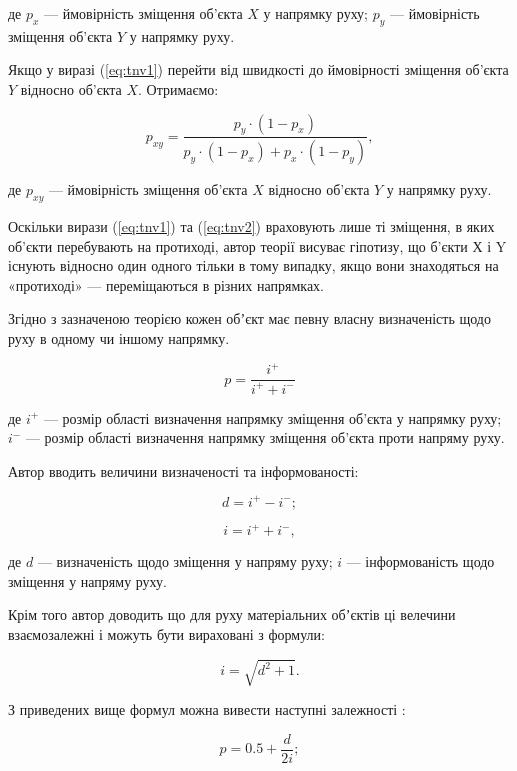 \noindent
де $p_x$ --- ймовірність зміщення об'єкта $X$ у напрямку руху; $p_y$ --- ймовірність зміщення об'єкта $Y$ у напрямку руху.

Якщо у виразі (\ref{eq:tnv1}) перейти від швидкості до ймовірності зміщення об'єкта $Y$ відносно об'єкта $X$. Отримаємо:

\begin{equation}
\label{eq:tnv2}
p_{xy}=\frac{p_y\cdot(1-p_x)}{p_y\cdot(1-p_x)+p_x\cdot(1-p_y)},
\end{equation}

\noindent
де $p_{xy}$ --- ймовірність зміщення об'єкта $X$ відносно об'єкта $Y$ у напрямку руху.

Оскільки вирази (\ref{eq:tnv1}) та (\ref{eq:tnv2}) враховують лише ті зміщення, в яких об'єкти перебувають на протиході, автор теорії висуває гіпотизу, що б'єкти Х і Y існують відносно один одного тільки в тому випадку, якщо вони знаходяться на «протиході» --- переміщаються в різних напрямках.

Згідно з зазначеною теорією кожен обʼєкт має певну власну визначеність щодо руху в одному чи іншому напрямку. 

\[
	p=\frac{i^+}{i^+ + i^-}
\]

\noindent
де $i^+$ --- розмір області визначення напрямку зміщення об'єкта у напрямку руху; $i^-$ --- розмір області визначення напрямку зміщення об'єкта проти напряму руху.

Автор вводить величини визначеності та інформованості:

\begin{equation}
\label{eq:tnv3}
d=i^+ - i^-;
\end{equation}

\begin{equation}
\label{eq:tnv4}
i=i^+ + i^-,
\end{equation}

\noindent
де $d$ --- визначеність щодо зміщення у напряму руху; $i$ --- інформованість щодо зміщення у напряму руху.

Крім того автор доводить що для руху матеріальних обʼєктів ці велечини взаємозалежні і можуть бути вираховані з формули: 

\begin{equation}
\label{eq:tnv7}
i=\sqrt{d^2+1}.
\end{equation}

З приведених вище формул можна вивести наступні залежності \cite{Teslia_2010}:

\begin{equation}
\label{eq:tnv5}
p=0.5+\frac{d}{2i};
\end{equation}

